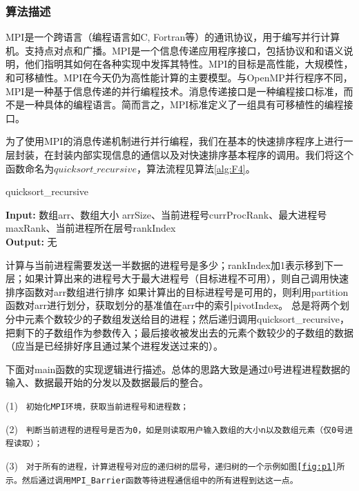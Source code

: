 \documentclass[supercite]{Experimental_Report}
\theoremstyle{definition}
\begin{document}
\subsubsection{算法描述}
MPI是一个跨语言（编程语言如C, Fortran等）的通讯协议，用于编写并行计算机。支持点对点和广播。MPI是一个信息传递应用程序接口，包括协议和和语义说明，他们指明其如何在各种实现中发挥其特性。MPI的目标是高性能，大规模性，和可移植性。MPI在今天仍为高性能计算的主要模型。与OpenMP并行程序不同，MPI是一种基于信息传递的并行编程技术。消息传递接口是一种编程接口标准，而不是一种具体的编程语言。简而言之，MPI标准定义了一组具有可移植性的编程接口。

为了使用MPI的消息传递机制进行并行编程，我们在基本的快速排序程序上进行一层封装，在封装内部实现信息的通信以及对快速排序基本程序的调用。我们将这个函数命名为$quicksort\_recursive$，算法流程见算法\ref{alg:F4}。

\begin{algorithm}[htb]
\caption{quicksort\_recursive}
\label{alg:F4}
\hspace*{0.02in} {\bf Input:}
数组arr、数组大小 arrSize、当前进程号currProcRank、最大进程号maxRank、当前进程所在层号rankIndex\\
\hspace*{0.02in} {\bf Output:} 
无
  \begin{algorithmic}[1]
    \State
        计算与当前进程需要发送一半数据的进程号是多少；rankIndex加1表示移到下一层；如果计算出来的进程号大于最大进程号（目标进程不可用），则自己调用快速排序函数对arr数组进行排序
    \State
        如果计算出的目标进程号是可用的，则利用partition函数对arr进行划分，获取划分的基准值在arr中的索引pivotIndex。
    \State
        总是将两个划分中元素个数较少的子数组发送给目的进程；然后递归调用quicksort\_recursive，把剩下的子数组作为参数传入；最后接收被发出去的元素个数较少的子数组的数据（应当是已经排好序且通过某个进程发送过来的）。
  \end{algorithmic}
\end{algorithm}



下面对main函数的实现逻辑进行描述。总体的思路大致是通过0号进程进程数据的输入、数据最开始的分发以及数据最后的整合。

(1) \texttt{ 初始化MPI环境，获取当前进程号和进程数；}

(2) \texttt{ 判断当前进程的进程号是否为0，如是则读取用户输入数组的大小n以及数组元素（仅0号进程读取）；}

(3) \texttt{ 对于所有的进程，计算进程号对应的递归树的层号，递归树的一个示例如图\ref{fig:p1}所示。然后通过调用MPI\_Barrier函数等待进程通信组中的所有进程到达这一点。}
\end{document}
